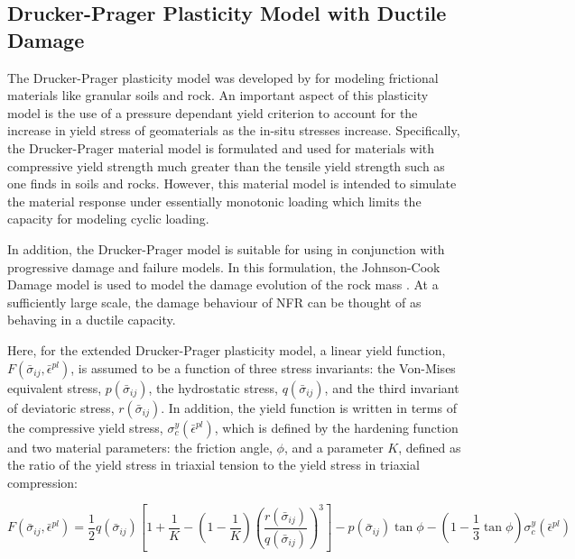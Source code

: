 \subsection{Drucker-Prager Plasticity Model with Ductile Damage}
The Drucker-Prager plasticity model was developed by \citet{drucker_implications_1950} for modeling frictional materials like granular soils and rock. An important aspect of this plasticity model is the use of a pressure dependant yield criterion to account for the increase in yield stress of geomaterials as the in-situ stresses increase. Specifically, the Drucker-Prager material model is formulated and used for materials with compressive yield strength much greater than the tensile yield strength such as one finds in soils and rocks. However, this material model is intended to simulate the material response under essentially monotonic loading which limits the capacity for modeling cyclic loading.

In addition, the Drucker-Prager model is suitable for using in conjunction with progressive damage and failure models. In this formulation, the Johnson-Cook Damage model is used to model the damage evolution of the rock mass \citep{Johnson_1985}. At a sufficiently large scale, the damage behaviour of NFR can be thought of as behaving in a ductile capacity. 

Here, for the extended Drucker-Prager plasticity model, a linear yield function, $F\left(\bar{\sigma}_{ij}, \bar{\epsilon}^{pl}\right)$, is assumed to be a function of three stress invariants: the Von-Mises equivalent stress, $p\left(\bar{\sigma}_{ij}\right)$, the hydrostatic stress, $q\left(\bar{\sigma}_{ij}\right)$, and the third invariant of deviatoric stress, $r\left(\bar{\sigma}_{ij}\right)$. In addition, the yield function is written in terms of the compressive yield stress, $\sigma_c^y\left(\bar{\epsilon}^{pl}\right)$, which is defined by the hardening function and two material parameters: the friction angle, $\phi$, and a parameter $K$, defined as the ratio of the yield stress in triaxial tension to the yield stress in triaxial compression:

\begin{equation}
F\left(\bar{\sigma}_{ij}, \bar{\epsilon}^{pl}\right)=\frac{1}{2}q\left(\bar{\sigma}_{ij}\right)\left [ 1+\frac{1}{K}-\left ( 1-\frac{1}{K} \right )\left ( \frac{r\left(\bar{\sigma}_{ij}\right)}{q\left(\bar{\sigma}_{ij}\right)} \right )^3 \right ]-p\left(\bar{\sigma}_{ij}\right)\tan\phi - \left(1-\frac{1}{3}\tan\phi \right)\sigma_c^y\left(\bar{\epsilon}^{pl}\right)
\label{eqn:const8c}
\end{equation}

